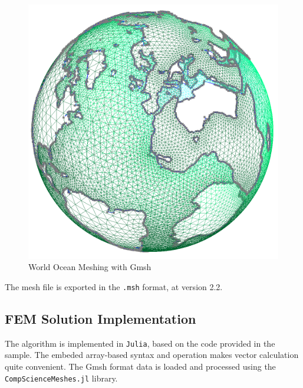 \documentclass[a4paper]{article}
\begin{document}
\begin{figure}[H]
    \includegraphics[width=0.83\linewidth]{./images/mesh.png}
    \centering
    \caption{World Ocean Meshing with Gmsh}
    \label{fig:mesh}
\end{figure}
    

The mesh file is exported in the \verb|.msh| format, at version 2.2.


\subsection{FEM Solution Implementation}
The algorithm is implemented in \verb|Julia|, based on the code provided in the sample.
The embeded array-based syntax and operation makes vector calculation quite convenient.
The Gmsh format data is loaded and processed using the \verb|CompScienceMeshes.jl| library.
\end{document}
